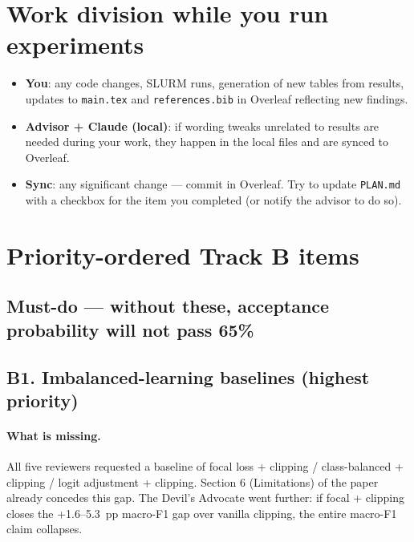 \documentclass[11pt,a4paper]{article}
\newcommand{\code}[1]{\texttt{#1}}
\newcommand{\file}[1]{\texttt{#1}}
\begin{document}
\section*{Work division while you run experiments}

\begin{itemize}[nosep]
  \item \textbf{You}: any code changes, SLURM runs, generation of new tables
        from results, updates to \code{main.tex} and \code{references.bib}
        in Overleaf reflecting new findings.
  \item \textbf{Advisor + Claude (local)}: if wording tweaks unrelated to
        results are needed during your work, they happen in the local files
        and are synced to Overleaf.
  \item \textbf{Sync}: any significant change --- commit in Overleaf. Try to
        update \file{PLAN.md} with a checkbox for the item you completed
        (or notify the advisor to do so).
\end{itemize}

\section{Priority-ordered Track B items}

\subsection*{Must-do --- without these, acceptance probability will not
             pass 65\%}

\subsection{B1. Imbalanced-learning baselines (highest priority)}

\paragraph{What is missing.} All five reviewers requested a baseline of
focal loss + clipping / class-balanced + clipping / logit adjustment +
clipping. Section 6 (Limitations) of the paper already concedes this gap.
The Devil's Advocate went further: if focal + clipping closes the
\mbox{+1.6--5.3~pp} macro-F1 gap over vanilla clipping, the entire macro-F1
claim collapses.
\end{document}
